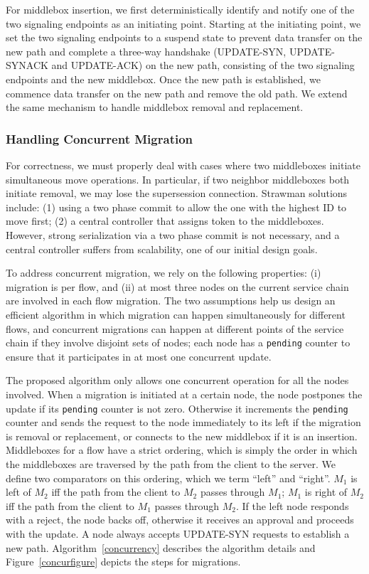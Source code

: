 For middlebox insertion, we first deterministically identify and notify one of the two signaling endpoints as an initiating point. Starting at the initiating point, we set the two signaling endpoints to a suspend state to prevent data transfer on the new path and complete a three-way handshake (UPDATE-SYN, UPDATE-SYNACK and UPDATE-ACK) on the new path, consisting of the two signaling endpoints and the new middlebox. Once the new path is established, we commence data transfer on the new path and remove the old path. We extend the same mechanism to handle middlebox removal and replacement. 

\subsubsection{Handling Concurrent Migration}
For correctness, we must properly deal with cases where two middleboxes initiate simultaneous move operations. In particular, if two neighbor middleboxes both initiate removal, we may lose the supersession connection. Strawman solutions include: (1) using a two phase commit to allow the one with the highest ID to move first; (2) a central controller that assigns token to the middleboxes. However, strong serialization via a two phase commit is not necessary, and a central controller suffers from scalability, one of our initial design goals.

To address concurrent migration, we rely on the following properties: (i) migration is per flow, and (ii) at most three nodes on the current service chain are involved in each flow migration. The two assumptions help us design an efficient algorithm in which migration can happen simultaneously for different flows, and concurrent migrations can happen at different points of the service chain if they involve disjoint sets of nodes; each node has a \texttt{pending} counter to ensure that it participates in at most one concurrent update.


The proposed algorithm only allows one concurrent operation for all the nodes involved. When a migration is initiated at a certain node, the node postpones the update if its \texttt{pending} counter is not zero. Otherwise it increments the \texttt{pending} counter and sends the request to the node immediately to its left if the migration is removal or replacement, or connects to the new middlebox if it is an insertion. Middleboxes for a flow have a strict ordering, which is simply the order in which the middleboxes are traversed by the path from the client to the server. We define two comparators on this ordering, which we term ``left'' and ``right''. $M_{1}$ is left of $M_{2}$ iff the path from the client to $M_{2}$ passes through $M_{1}$; $M_{1}$ is right of $M_{2}$ iff the path from the client to $M_{1}$ passes through $M_{2}$. If the left node responds with a reject, the node backs off, otherwise it receives an approval and proceeds with the update. A node always accepts UPDATE-SYN requests to establish a new path. Algorithm~\ref{concurrency} describes the algorithm details and Figure~\ref{concurfigure} depicts the steps for migrations.


